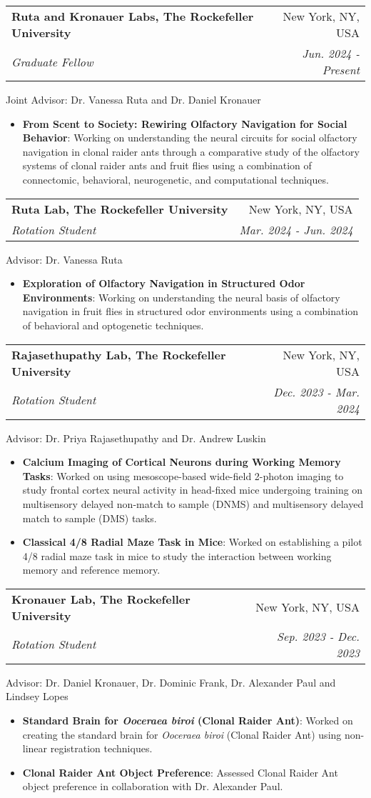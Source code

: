 \documentclass[letterpaper,9pt]{article}
\makeatletter
\newcommand{\resumeItem}[2]{
  \item\small{
    \textbf{#1}{: #2 \vspace{-2pt}}
  }
}
\newcommand{\resumeSubheadingWithText}[5]{
  \vspace{-1pt}\item
    \begin{tabular*}{0.97\textwidth}[t]{l@{\extracolsep{\fill}}r}
      \textbf{#1} & #2 \\
      \textit{\small#3} & \textit{\small #4}
    \end{tabular*}\vspace{2pt}
}
\newcommand{\resumeItemListStart}{\begin{itemize}}
\newcommand{\resumeItemListEnd}{\end{itemize}\vspace{-5pt}}
\makeatother
\begin{document}
    \resumeSubheadingWithText
    {Ruta and Kronauer Labs, The Rockefeller University}{New York, NY, USA}
    {Graduate Fellow}{Jun. 2024 - Present}
    \small{Joint Advisor: Dr. Vanessa Ruta and Dr. Daniel Kronauer}
    \resumeItemListStart
      \resumeItem{From Scent to Society: Rewiring Olfactory Navigation for Social Behavior}
        {Working on understanding the neural circuits for social olfactory navigation in clonal raider ants through a comparative study of the olfactory systems of clonal raider ants and fruit flies using a combination of connectomic, behavioral, neurogenetic, and computational techniques.}
    \resumeItemListEnd


    \resumeSubheadingWithText
      {Ruta Lab, The Rockefeller University}{New York, NY, USA}
      {Rotation Student}{Mar. 2024 - Jun. 2024}
      \small{Advisor: Dr. Vanessa Ruta}
      \resumeItemListStart
        \resumeItem{Exploration of Olfactory Navigation in Structured Odor Environments}
          {Working on understanding the neural basis of olfactory navigation in fruit flies in structured odor environments using a combination of behavioral and optogenetic techniques.}
      \resumeItemListEnd

    \resumeSubheadingWithText
      {Rajasethupathy Lab, The Rockefeller University}{New York, NY, USA}
      {Rotation Student}{Dec. 2023 - Mar. 2024}
      \small{Advisor: Dr. Priya Rajasethupathy and Dr. Andrew Luskin}
      \resumeItemListStart
        \resumeItem{Calcium Imaging of Cortical Neurons during Working Memory Tasks}
          {Worked on using mesoscope-based wide-field 2-photon imaging to study frontal cortex neural activity in head-fixed mice undergoing training on multisensory delayed non-match to sample (DNMS) and multisensory delayed match to sample (DMS) tasks.}
        \resumeItem{Classical 4/8 Radial Maze Task in Mice}
          {Worked on establishing a pilot 4/8 radial maze task in mice to study the interaction between working memory and reference memory.}
      \resumeItemListEnd
      
    \resumeSubheadingWithText
      {Kronauer Lab, The Rockefeller University}{New York, NY, USA}
      {Rotation Student}{Sep. 2023 - Dec. 2023}
      \small{Advisor: Dr. Daniel Kronauer, Dr. Dominic Frank, Dr. Alexander Paul and Lindsey Lopes}
      \resumeItemListStart
        \resumeItem{Standard Brain for \textit{Ooceraea biroi} (Clonal Raider Ant)}
          {Worked on creating the standard brain for \textit{Ooceraea biroi} (Clonal Raider Ant) using non-linear registration techniques.}
        \resumeItem{Clonal Raider Ant Object Preference}
          {Assessed Clonal Raider Ant object preference in collaboration with Dr. Alexander Paul.}
      \resumeItemListEnd
\end{document}
